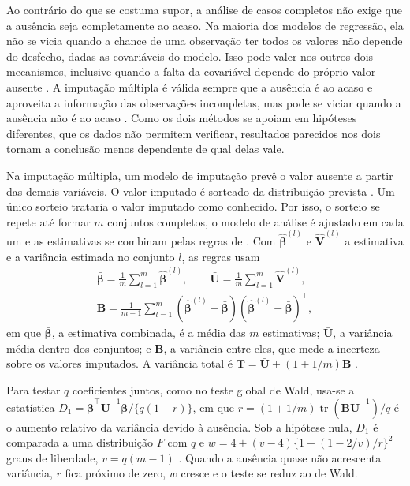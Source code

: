 \documentclass[12pt,a4paper]{article}
\begin{document}
Ao contrário do que se costuma supor, a análise de casos completos não exige que a ausência seja completamente ao acaso. Na maioria dos modelos de regressão, ela não se vicia quando a chance de uma observação ter todos os valores não depende do desfecho, dadas as covariáveis do modelo. Isso pode valer nos outros dois mecanismos, inclusive quando a falta da covariável depende do próprio valor ausente \citep[p.~3]{hughes2019accounting}. A imputação múltipla é válida sempre que a ausência é ao acaso e aproveita a informação das observações incompletas, mas pode se viciar quando a ausência não é ao acaso \citep[p.~2]{hughes2019accounting}. Como os dois métodos se apoiam em hipóteses diferentes, que os dados não permitem verificar, resultados parecidos nos dois tornam a conclusão menos dependente de qual delas vale.

Na imputação múltipla, um modelo de imputação prevê o valor ausente a partir das demais variáveis. O valor imputado é sorteado da distribuição prevista \citep[p.~5]{hughes2019accounting}. Um único sorteio trataria o valor imputado como conhecido. Por isso, o sorteio se repete até formar $m$ conjuntos completos, o modelo de análise é ajustado em cada um e as estimativas se combinam pelas regras de \citet{rubin1987multiple}. Com $\hat{\boldsymbol{\beta}}^{(l)}$ e $\widehat{\mathbf{V}}^{(l)}$ a estimativa e a variância estimada no conjunto $l$, as regras usam
\begin{gather*}
  \bar{\boldsymbol{\beta}} = \frac{1}{m}\sum_{l=1}^{m}\hat{\boldsymbol{\beta}}^{(l)}, \qquad \bar{\mathbf{U}} = \frac{1}{m}\sum_{l=1}^{m}\widehat{\mathbf{V}}^{(l)}, \\
  \mathbf{B} = \frac{1}{m-1}\sum_{l=1}^{m}(\hat{\boldsymbol{\beta}}^{(l)} - \bar{\boldsymbol{\beta}})(\hat{\boldsymbol{\beta}}^{(l)} - \bar{\boldsymbol{\beta}})^\top,
\end{gather*}
em que $\bar{\boldsymbol{\beta}}$, a estimativa combinada, é a média das $m$ estimativas; $\bar{\mathbf{U}}$, a variância média dentro dos conjuntos; e $\mathbf{B}$, a variância entre eles, que mede a incerteza sobre os valores imputados. A variância total é $\mathbf{T} = \bar{\mathbf{U}} + (1 + 1/m)\mathbf{B}$ \citep{li1991large}.

Para testar $q$ coeficientes juntos, como no teste global de Wald, usa-se a estatística $D_1 = \bar{\boldsymbol{\beta}}^\top\bar{\mathbf{U}}^{-1}\bar{\boldsymbol{\beta}} / \{q(1 + r)\}$, em que $r = (1 + 1/m)\operatorname{tr}(\mathbf{B}\bar{\mathbf{U}}^{-1})/q$ é o aumento relativo da variância devido à ausência. Sob a hipótese nula, $D_1$ é comparada a uma distribuição $F$ com $q$ e $w = 4 + (v - 4)\{1 + (1 - 2/v)/r\}^2$ graus de liberdade, $v = q(m - 1)$ \citep{li1991large}. Quando a ausência quase não acrescenta variância, $r$ fica próximo de zero, $w$ cresce e o teste se reduz ao de Wald.
\end{document}
